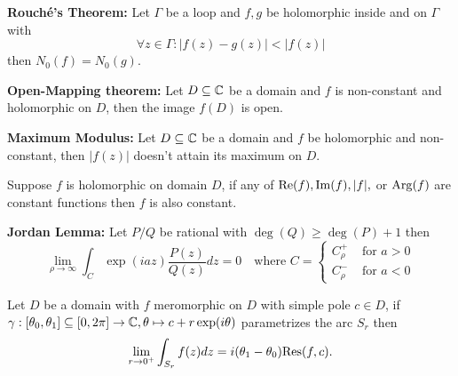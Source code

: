 \begin{multicols}{2}
\begin{theorem}
\textbf{Rouch\'e's Theorem:} Let $\Gamma$ be a loop and $f,g$ be holomorphic inside and on $\Gamma$ with
    \[
    \forall z\in\Gamma: |f(z)-g(z)|<|f(z)|
    \]
then $N_0(f)=N_0(g)$.
\end{theorem}

\begin{theorem}
\textbf{Open-Mapping theorem:} Let $D\subseteq\mathbb{C}$ be a domain and $f$ is non-constant and holomorphic on $D$, then the image $f(D)$ is open.
\end{theorem}

\begin{theorem}
\textbf{Maximum Modulus:} Let $D\subseteq\mathbb{C}$ be a domain and $f$ be holomorphic and non-constant, then $|f(z)|$ doesn't attain its maximum on $D$.
\end{theorem}

\begin{theorem}[5.2.18]
Suppose $f$ is holomorphic on domain $D$, if any of $\mathrm{Re}(f), \mathrm{Im}(f), |f|,$ or $\mathrm{Arg}(f)$ are constant functions then $f$ is also constant.
\end{theorem}

\begin{theorem}
\textbf{Jordan Lemma:} Let $P/Q$ be rational with $\deg(Q)\geq\deg(P)+1$ then
    \[
    \lim_{\rho\to\infty}\int_{C}\exp(iaz)\frac{P(z)}{Q(z)}dz=0
    \quad\text{where } C=
    \begin{cases}
    C_\rho^+ &\text{ for }a>0\\
    C_\rho^- &\text{ for }a<0
    \end{cases}
    \]
\end{theorem}

\begin{theorem}[5.5.3]
Let $D$ be a domain with $f$ meromorphic on $D$ with simple pole $c\in D$, if $\gamma:[\theta_0,\theta_1]\subseteq[0,2\pi]\to\mathbb{C}, \theta\mapsto c + r\exp(i\theta)$ parametrizes the arc $S_r$  then
    \[
    \lim_{r\to0^+}\int_{S_r}f(z)dz = i(\theta_1-\theta_0)\mathrm{Res}(f,c).
    \]
\end{theorem}



\end{multicols}